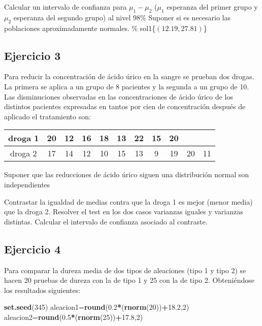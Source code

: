 \documentclass[
]{article}
\newenvironment{Shaded}{\begin{snugshade}}{\end{snugshade}}
\newcommand{\DecValTok}[1]{\textcolor[rgb]{0.00,0.00,0.81}{#1}}
\newcommand{\FloatTok}[1]{\textcolor[rgb]{0.00,0.00,0.81}{#1}}
\newcommand{\KeywordTok}[1]{\textcolor[rgb]{0.13,0.29,0.53}{\textbf{#1}}}
\newcommand{\NormalTok}[1]{#1}
\newcommand{\OperatorTok}[1]{\textcolor[rgb]{0.81,0.36,0.00}{\textbf{#1}}}
\begin{document}
Calcular un intervalo de confianza para \(\mu_{1}-\mu_{2}\) (\(\mu_{1}\)
esperanza del primer grupo y \(\mu_{2}\) esperanza del segundo grupo) al
nivel 98\% Suponer si es necesario las poblaciones aproximadamente
normales. \% sol1\{\(\left(12.19,27.81\right)\)\}

\hypertarget{ejercicio-3}{%
\subsection{Ejercicio 3}\label{ejercicio-3}}

Para reducir la concentración de ácido úrico en la sangre se prueban dos
drogas. La primera se aplica a un grupo de 8 pacientes y la segunda a un
grupo de 10. Las disminuciones observadas en las concentraciones de
ácido úrico de los distintos pacientes expresadas en tantos por cien de
concentración después de aplicado el tratamiento son:

\begin{center}
\begin{tabular}{|c|c|c|c|c|c|c|c|c|c|c|}
droga 1 & 20 & 12 & 16 & 18 & 13 & 22 & 15 & 20\\ \hline droga 2 & 17 & 14 & 12 & 10 & 15 &
13 & 9 & 19 & 20 & 11
\end{tabular}
\end{center}

Suponer que las reducciones de ácido úrico siguen una distribución
normal son independientes

Contrastar la igualdad de medias contra que la droga 1 es mejor (menor
media) que la droga 2. Resolver el test en los dos casos varianzas
iguales y varianzas distintas. Calcular el intervalo de confianza
asociado al contraste.

\hypertarget{ejercicio-4}{%
\subsection{Ejercicio 4}\label{ejercicio-4}}

Para comparar la dureza media de dos tipos de aleaciones (tipo 1 y tipo
2) se hacen 20 pruebas de dureza con la de tipo 1 y 25 con la de tipo 2.
Obteniéndose los resultados siguientes:

\begin{Shaded}
\begin{Highlighting}[]
\KeywordTok{set.seed}\NormalTok{(}\DecValTok{345}\NormalTok{)}
\NormalTok{aleacion1=}\KeywordTok{round}\NormalTok{(}\FloatTok{0.2}\OperatorTok{*}\NormalTok{(}\KeywordTok{rnorm}\NormalTok{(}\DecValTok{20}\NormalTok{))}\OperatorTok{+}\FloatTok{18.2}\NormalTok{,}\DecValTok{2}\NormalTok{)}
\NormalTok{aleacion2=}\KeywordTok{round}\NormalTok{(}\FloatTok{0.5}\OperatorTok{*}\NormalTok{(}\KeywordTok{rnorm}\NormalTok{(}\DecValTok{25}\NormalTok{))}\OperatorTok{+}\FloatTok{17.8}\NormalTok{,}\DecValTok{2}\NormalTok{)}
\end{Highlighting}
\end{Shaded}
\end{document}
